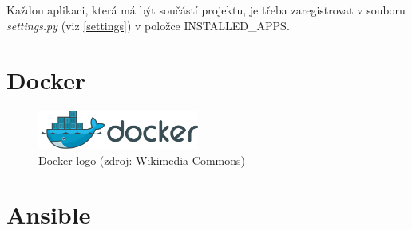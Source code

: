 Každou aplikaci, která má být součástí projektu, je třeba
zaregistrovat v souboru \textit{settings.py} (viz \ref{settings}) v
položce \textsf{INSTALLED\_APPS}.

\section{Docker}
\label{docker}

\begin{figure}[H] \centering
      \includegraphics[width=150pt]{./pictures/Docker_(container_engine)_logo.png}
      \caption[Docker logo]{Docker logo (zdroj:
\href{https://commons.wikimedia.org/wiki/File:Docker_(container_engine)_logo.png}{Wikimedia Commons})}
      \label{fig:docker}
  \end{figure}

\section{Ansible}
\label{ansible}  

